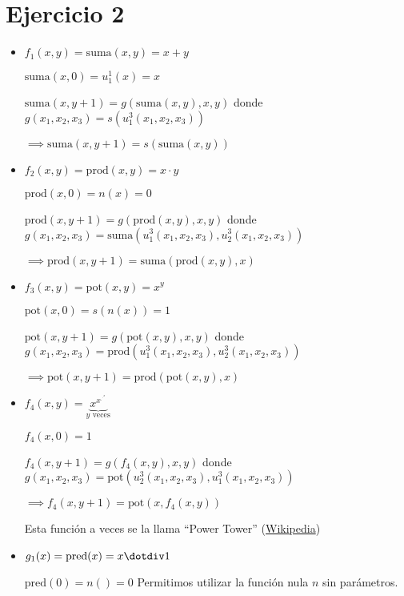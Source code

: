 \section*{Ejercicio 2}

\begin{itemize}
    \item
    $f_1(x, y) = \text{suma}(x, y) = x + y$

    $\text{suma}(x, 0) = u^1_1(x) = x$

    $\text{suma}(x, y + 1) = g(\text{suma}(x, y), x, y)$ donde $g(x_1, x_2, x_3) = s(u^3_1(x_1, x_2, x_3))$

    $\implies \text{suma}(x, y + 1) = s(\text{suma}(x, y))$

    \item
    $f_2(x, y) = \text{prod}(x, y) = x \cdot y$

    $\text{prod}(x, 0) = n(x) = 0$

    $\text{prod}(x, y + 1) = g(\text{prod}(x, y), x, y)$ donde $g(x_1, x_2, x_3) = \text{suma}(u^3_1(x_1, x_2, x_3), u^3_2(x_1, x_2, x_3))$

    $\implies \text{prod}(x, y + 1) = \text{suma}(\text{prod}(x, y), x)$

    \item
    $f_3(x, y) = \text{pot}(x, y) = x^y$

    $\text{pot}(x, 0) = s(n(x)) = 1$

    $\text{pot}(x, y + 1) = g(\text{pot}(x, y), x, y)$ donde $g(x_1, x_2, x_3) = \text{prod}(u^3_1(x_1, x_2, x_3), u^3_2(x_1, x_2, x_3))$

    $\implies \text{pot}(x, y + 1) = \text{prod}(\text{pot}(x, y), x)$

    \item
    $f_4(x, y) = \underbrace{x^{x^{.^{.^{x}}}}}_{\text{$y$ veces}}$

    $f_4(x, 0) = 1$

    $f_4(x, y + 1) = g(f_4(x, y), x, y)$ donde $g(x_1, x_2, x_3) = \text{pot}(u^3_2(x_1, x_2, x_3), u^3_1(x_1, x_2, x_3))$

    $\implies f_4(x, y + 1) = \text{pot}(x,  f_4(x, y))$

    Esta función a veces se la llama ``Power Tower'' (\href{https://en.wikipedia.org/wiki/Tetration#Terminology}{Wikipedia})

    \item
    $g_1(x) = \text{pred}(x) = x \dotdiv 1$

    $\text{pred}(0) = n() = 0$ Permitimos utilizar la función nula $n$ sin parámetros.


\end{itemize}
